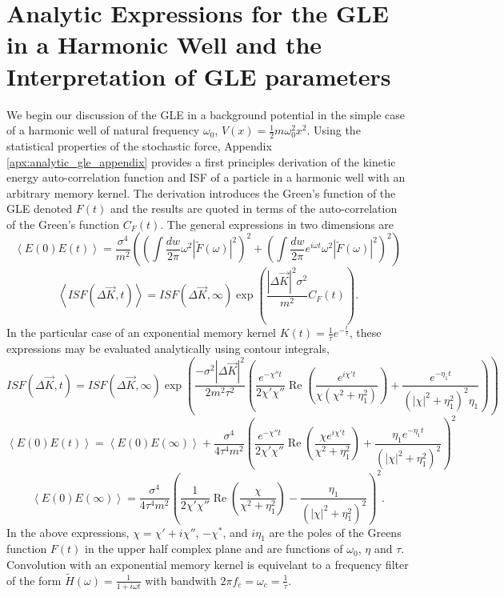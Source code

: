 \chapter{Analytic Expressions for the GLE in a Harmonic Well and the Interpretation of GLE parameters} \label{sec:gle_interpretation}

We begin our discussion of the GLE in a background potential in the simple case of a harmonic well of natural frequency $\omega_0$, $V\left(x\right) = \frac{1}{2}m\omega_0^2x^2$. Using the statistical properties of the stochastic force, Appendix \ref{apx:analytic_gle_appendix} provides a first principles derivation of the kinetic energy auto-correlation function and ISF of a particle in a harmonic well with an arbitrary memory kernel. The derivation introduces the Green's function of the GLE denoted $F\left(t\right)$ and the results are quoted in terms of the auto-correlation of the Green's function $C_F(t)$. The general expressions in two dimensions are
\begin{equation}
\left<E(0)E(t)\right>=\frac{\sigma^4}{m^2}\left(\left(\int\frac{dw}{2\pi}\omega^2\left|\tilde{F}(\omega)\right|^2\right)^2 + \left(\int\frac{dw}{2\pi}e^{i\omega t}\omega^2\left|\tilde{F}(\omega)\right|^2\right)^2\right) \label{eq:harmonic_gle_ek}
\end{equation}
\begin{equation}
\left<ISF(\Delta \vec{K}, t)\right> = ISF\left(\Delta \vec{K}, \infty \right)\exp\left(\frac{|\Delta \vec{K}|^2 \sigma^2}{m^2} C_F\left(t\right) \right). \label{eq:harmonic_gle_isf}
\end{equation}
In the particular case of an exponential memory kernel $K(t)=\frac{1}{\tau}e^{-\frac{t}{\tau}}$, these expressions may be evaluated analytically using contour integrals,
\begin{equation}
        ISF\left(\Delta \vec{K}, t\right) = ISF\left(\Delta \vec{K}, \infty\right) \exp\left(\frac{-\sigma^2\left|\Delta \vec{K}\right|^2}{2m^2\tau^2}\left(\frac{e^{-\chi''t}}{2\chi'\chi''}\operatorname{Re}\left(\frac{e^{i\chi't}}{\chi\left(\chi^2+\eta_1^2\right)}\right) + \frac{e^{-\eta_1t}}{\left(\left|\chi\right|^2+\eta_1^2\right)^2\eta_1}\right)\right) \label{eq:exp_isf}
\end{equation}
\begin{equation}
        \left<E(0)E(t)\right>=\left<E(0)E(\infty)\right> + \frac{\sigma^4}{4\tau^4m^2}\left(\frac{e^{-\chi''t}}{2\chi'\chi''}\operatorname{Re}\left(\frac{\chi e^{i\chi't}}{\chi^2+\eta_1^2}\right) + \frac{\eta_1e^{-\eta_1 t}}{\left(\left|\chi\right|^2 + \eta_1^2\right)^2} \right)^2 \label{eq:exp_ek_auto}
\end{equation}
$$
\left<E(0)E(\infty)\right> = \frac{\sigma^4}{4\tau^4m^2}\left(\frac{1}{2\chi'\chi''}\operatorname{Re}\left(\frac{\chi}{\chi^2+\eta_1^2}\right) - \frac{\eta_1}{\left(\left|\chi\right|^2 + \eta_1^2\right)^2} \right)^2.
$$
In the above expressions, $\chi = \chi' + i\chi''$, $-\chi^*$, and $i\eta_1$ are the poles of the Greens function $F(t)$ in the upper half complex plane and are functions of $\omega_0$, $\eta$ and $\tau$. Convolution with an exponential memory kernel is equivelant to a frequency filter of the form $\tilde{H}(\omega) = \frac{1}{1+i\omega t}$ with bandwith $2\pi f_c = \omega_c = \frac{1}{\tau}$. 

